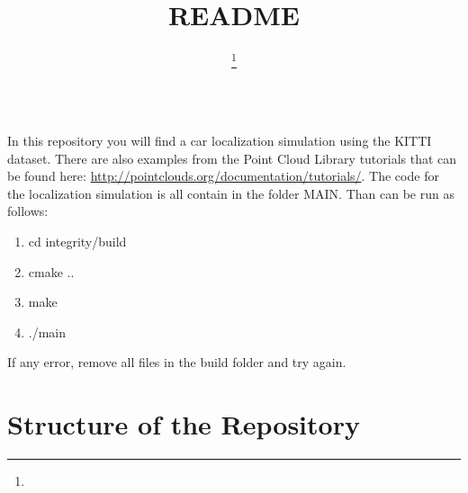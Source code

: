 \documentclass[twoside]{article}
\title{\vspace{-15mm}\fontsize{24pt}{10pt}\selectfont\textbf{README}} %
\author{
\large
\textsc{}\thanks{}\\[2mm] %
\normalsize  \\ %
\normalsize \href{mailto:}{} %
\vspace{-5mm}
}
\date{}
\begin{document}
In this repository you will find a car localization simulation using the KITTI dataset. There are also examples from the Point Cloud Library tutorials that can be found here: \url{http://pointclouds.org/documentation/tutorials/}. The code for the localization simulation is all contain in the folder MAIN. Than can be run as follows:
\begin{enumerate}
\item cd integrity/build
\item cmake ..
\item make
\item ./main
\end{enumerate}
If any error, remove all files in the build folder and try again. 

\section{Structure of the Repository}
\end{document}
